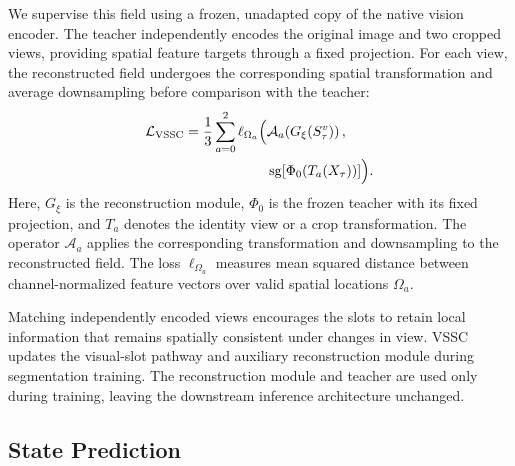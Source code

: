We supervise this field using a frozen, unadapted copy of the native vision encoder. The teacher independently encodes the original image and two cropped views, providing spatial feature targets through a fixed projection. For each view, the reconstructed field undergoes the corresponding spatial transformation and average downsampling before comparison with the teacher:
\begin{equation}
    \begin{aligned}
        \mathcal L_{\mathrm{VSSC}}
        =\frac{1}{3}\sum_{a=0}^{2}\ell_{\Omega_a}\Bigl(
        &\mathcal A_a\!\left(G_\xi(S_\tau^{v})\right),\\
        &\operatorname{sg}\!\left[\Phi_0(T_a(X_\tau))\right]\Bigr).
    \end{aligned}
    \label{eq:vssc_loss}
\end{equation}
Here, $G_\xi$ is the reconstruction module, $\Phi_0$ is the frozen teacher with its fixed projection, and $T_a$ denotes the identity view or a crop transformation. The operator $\mathcal A_a$ applies the corresponding transformation and downsampling to the reconstructed field. The loss $\ell_{\Omega_a}$ measures mean squared distance between channel-normalized feature vectors over valid spatial locations $\Omega_a$.

Matching independently encoded views encourages the slots to retain local information that remains spatially consistent under changes in view. VSSC updates the visual-slot pathway and auxiliary reconstruction module during segmentation training. The reconstruction module and teacher are used only during training, leaving the downstream inference architecture unchanged.

\subsection{State Prediction}
\label{sec:state_prediction}


